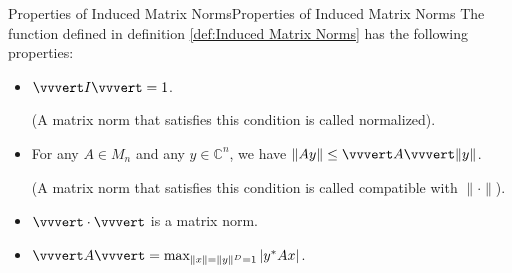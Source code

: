 \documentclass[../main.tex]{subfiles}
\begin{document}
\begin{theorem}{Properties of Induced Matrix Norms}{Properties of Induced Matrix Norms}
  The function defined in definition \ref{def:Induced Matrix Norms} has the following properties:
  \begin{itemize}
    \item $\vvvert I \vvvert = 1$.

      (A matrix norm that satisfies this condition is called normalized).
    \item For any $A \in M_n$ and any $y \in \mathbb{C}^n$, we have $\|A y\| \leq \vvvert A \vvvert \|y\|$.

      (A matrix norm that satisfies this condition is called compatible with $\|\cdot\|$).
    \item $\vvvert \cdot \vvvert$ is a matrix norm.
    \item $\vvvert A \vvvert = \max_{\|x\| = \|y\|^D = 1} |y^* A x|$.
  \end{itemize}
\end{theorem}
\end{document}
